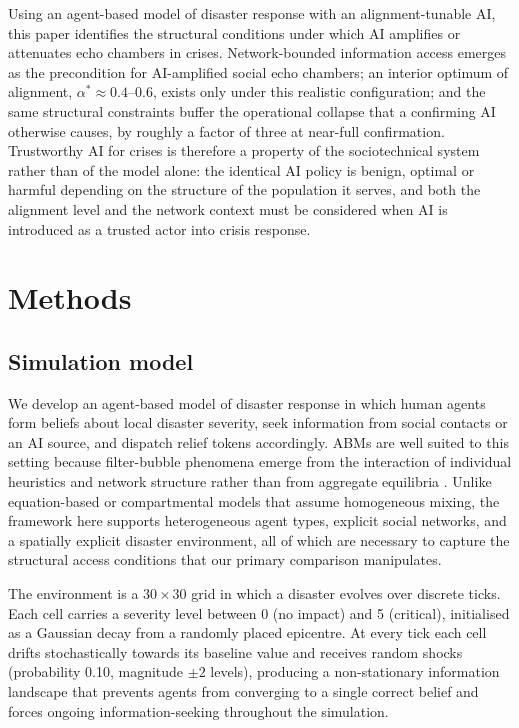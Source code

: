 \documentclass[pdflatex,sn-basic]{sn-jnl}
\begin{document}
Using an agent-based model of disaster response with an alignment-tunable AI, this paper identifies the structural conditions under which AI amplifies or attenuates echo chambers in crises. Network-bounded information access emerges as the precondition for AI-amplified social echo chambers; an interior optimum of alignment, $\alpha^{*} \approx 0.4$--$0.6$, exists only under this realistic configuration; and the same structural constraints buffer the operational collapse that a confirming AI otherwise causes, by roughly a factor of three at near-full confirmation. Trustworthy AI for crises is therefore a property of the sociotechnical system rather than of the model alone: the identical AI policy is benign, optimal or harmful depending on the structure of the population it serves, and both the alignment level and the network context must be considered when AI is introduced as a trusted actor into crisis response.

\section{Methods}\label{sec:methods}

\subsection{Simulation model}\label{sec:model}

We develop an agent-based model of disaster response in which human agents form beliefs about local disaster severity, seek information from social contacts or an AI source, and dispatch relief tokens accordingly. ABMs are well suited to this setting because filter-bubble phenomena emerge from the interaction of individual heuristics and network structure rather than from aggregate equilibria \citep{epstein2006generative,axelrod1997complexity}.
Unlike equation-based or compartmental models that assume homogeneous mixing, the framework here supports heterogeneous agent types, explicit social networks, and a spatially explicit disaster environment, all of which are necessary to capture the structural access conditions that our primary comparison manipulates.

The environment is a $30 \times 30$ grid in which a disaster evolves over discrete ticks. Each cell carries a severity level between 0 (no impact) and 5 (critical), initialised as a Gaussian decay from a randomly placed epicentre. At every tick each cell drifts stochastically towards its baseline value and receives random shocks (probability 0.10, magnitude $\pm 2$ levels), producing a non-stationary information landscape that prevents agents from converging to a single correct belief and forces ongoing information-seeking throughout the simulation.
\end{document}
